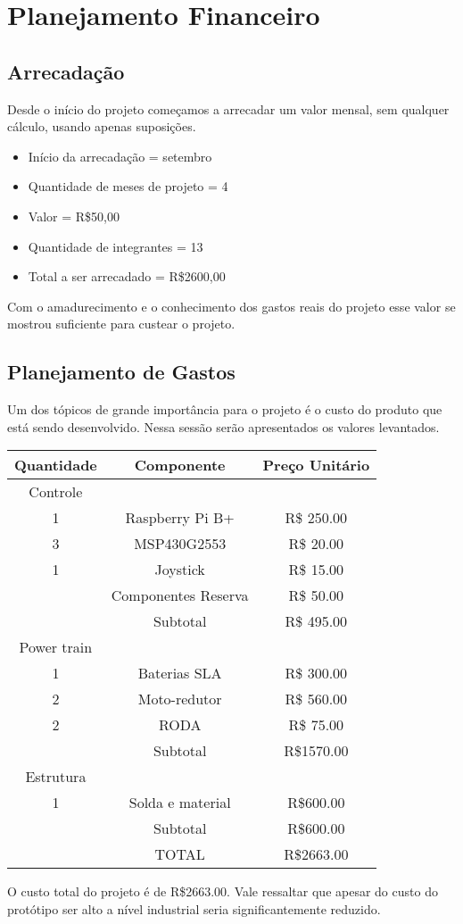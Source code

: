 \chapter[Planejamento Financeiro]{Planejamento Financeiro}
\section {Arrecadação}
Desde o início do projeto começamos a arrecadar um valor mensal, sem qualquer cálculo, usando apenas suposições.
  \begin{itemize}
    \item Início da arrecadação = setembro
    \item Quantidade de meses de projeto = 4
    \item Valor = R\$50,00
    \item Quantidade de integrantes = 13
    \item Total a ser arrecadado = R\$2600,00
  \end{itemize}
Com o amadurecimento e o conhecimento dos gastos reais do projeto esse valor se mostrou suficiente para custear o projeto.

\section {Planejamento de Gastos}
Um dos tópicos de grande importância para o projeto é o custo do produto que está sendo desenvolvido. Nessa sessão serão apresentados os valores levantados.


\begin{center}
\begin{tabular}{ |c|c|c| }
 \hline
Quantidade & Componente & Preço Unitário\\
 \hline
Controle &  & \\
 1 & Raspberry Pi B+   &  R\$ 250.00 \\
 3 & MSP430G2553  & R\$ 20.00 \\
 1 & Joystick  & R\$ 15.00 \\
 & Componentes Reserva & R\$ 50.00\\
& Subtotal & R\$ 495.00\\ \hline
Power train &  & \\
1 & Baterias SLA  & R\$ 300.00\\
2 & Moto-redutor&  R\$ 560.00\\
2 & RODA & R\$ 75.00\\
& Subtotal &  R\$1570.00\\ \hline
Estrutura &  & \\
1 &  Solda e material & R\$600.00\\
 & Subtotal & R\$600.00 \\ \hline
& TOTAL &  R\$2663.00\\ \hline
\end{tabular}
\end{center}

O custo total do projeto é de R\$2663.00.  Vale ressaltar que apesar do custo do protótipo ser alto a nível industrial seria significantemente reduzido.
